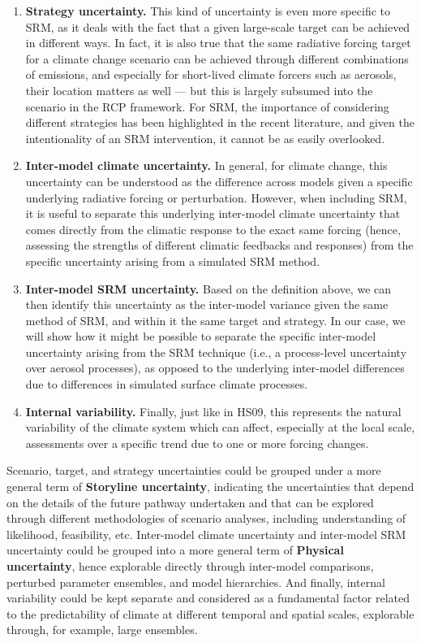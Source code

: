 \documentclass[draft]{agujournal2019}
\begin{document}
\begin{enumerate}
    \item \textbf{Strategy uncertainty.} This kind of uncertainty is even more specific to SRM, as it deals with the fact that a given large-scale target can be achieved in different ways. In fact, it is also true that the same radiative forcing target for a climate change scenario can be achieved through different combinations of emissions, and especially for short-lived climate forcers such as aerosols, their location matters as well --- but this is largely subsumed into the scenario in the RCP framework. For SRM, the importance of considering different strategies has been highlighted in the recent literature, and given the intentionality of an SRM intervention, it cannot be as easily overlooked.

    \item \textbf{Inter-model climate uncertainty.} In general, for climate change, this uncertainty can be understood as the difference across models given a specific underlying radiative forcing or perturbation. However, when including SRM, it is useful to separate this underlying inter-model climate uncertainty that comes directly from the climatic response to the exact same forcing (hence, assessing the strengths of different climatic feedbacks and responses) from the specific uncertainty arising from a simulated SRM method.

    \item \textbf{Inter-model SRM uncertainty.} Based on the definition above, we can then identify this uncertainty as the inter-model variance given the same method of SRM, and within it the same target and strategy. In our case, we will show how it might be possible to separate the specific inter-model uncertainty arising from the SRM technique (i.e., a process-level uncertainty over aerosol processes), as opposed to the underlying inter-model differences due to differences in simulated surface climate processes.

    \item \textbf{Internal variability.} Finally, just like in HS09, this represents the natural variability of the climate system which can affect, especially at the local scale, assessments over a specific trend due to one or more forcing changes.
\end{enumerate}

Scenario, target, and strategy uncertainties could be grouped under a more general term of \textbf{Storyline uncertainty}, indicating the uncertainties that depend on the details of the future pathway undertaken and that can be explored through different methodologies of scenario analyses, including understanding of likelihood, feasibility, etc. Inter-model climate uncertainty and inter-model SRM uncertainty could be grouped into a more general term of \textbf{Physical uncertainty}, hence explorable directly through inter-model comparisons, perturbed parameter ensembles, and model hierarchies. And finally, internal variability could be kept separate and considered as a fundamental factor related to the predictability of climate at different temporal and spatial scales, explorable through, for example, large ensembles.
\end{document}
